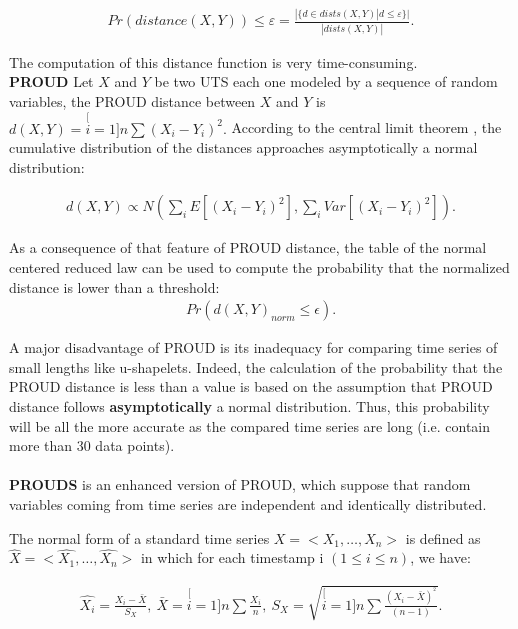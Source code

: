 \begin{eqnarray}
Pr(distance(X,Y))\leq\varepsilon=\frac{|\{d\in
dists(X,Y)|d\leq\varepsilon\}|}{|dists(X,Y)|}.
\end{eqnarray}

The computation of this distance function is very time-consuming.
\\
\textbf{PROUD} \cite{yeh2009proud} Let $X$ and $Y$ be two UTS each one modeled  by a sequence of random variables, the PROUD distance between $X$ and $Y$ is $d(X,Y)=\stackrel[i=1]{n}{\sum}(X_{i}-Y_{i})^{2}.$
According to the central limit theorem \cite{hoffmann1976law}, the cumulative distribution of the distances approaches asymptotically a normal distribution:

\begin{eqnarray}
d(X,Y)\propto
N(\underset{i}{\sum}E[(X_{i}-Y_{i})^{2}],\underset{i}{\sum}Var[(X_{i}-Y_{i})^{2}]).
\end{eqnarray}

As a consequence of that feature of PROUD distance,  the table of the normal centered reduced law can be used to compute the probability that the normalized distance is lower than a threshold:
\begin{eqnarray}
Pr(d(X,Y)_{norm}\leq\epsilon).
\end{eqnarray} 

A major disadvantage of PROUD is its inadequacy for comparing time series of small lengths like u-shapelets. Indeed, the calculation of the probability that the PROUD distance is less than a value is based on the assumption that PROUD distance follows \textbf{asymptotically} a normal distribution.  Thus, this probability will be all the more accurate as the compared time series are long (i.e. contain more than 30 data points).

\paragraph{}\textbf{PROUDS}\cite{Orang2015} is an enhanced version of PROUD, which suppose that random variables coming from time series are independent and
identically distributed. 


\begin{definition}
\label{normal}
The normal form of a standard time series $X = <X_1, \ldots, X_n>$ is defined as
$\hat{X}=<\hat{X_{1}},\ldots,\hat{X_{n}}>$ in which for each timestamp i $(1 \leq i \leq n)$, we have:

\begin{eqnarray}
\hat{X_{i}}=\frac{X_{i}-\bar{X}}{S_{X}},\:\bar{X}=\stackrel[i=1]{n}{\sum}\frac{X_{i}}{n},\:S_{X}=\sqrt{\stackrel[i=1]{n}{\sum}\frac{(X_{i}-\bar{X})^{^{2}}}{(n-1)}}.
\end{eqnarray}
\label{normal2}
\end{definition}



